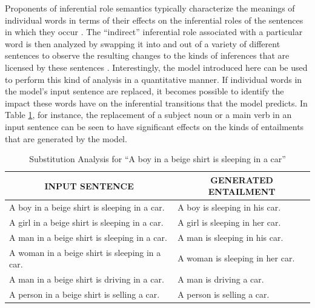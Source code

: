 Proponents of inferential role semantics typically characterize the meanings of individual words in terms of their effects on the inferential roles of the sentences in which they occur \citep{Brandom:1994,Brandom:2000,Block:1986}. The ``indirect'' inferential role associated with a particular word is then analyzed by swapping it into and out of a variety of different sentences to observe the resulting changes to the kinds of inferences that are licensed by these sentences \citep{Brandom:1994}. Interestingly, the model introduced here can be used to perform this kind of analysis in a quantitative manner. If individual words in the model's input sentence are replaced, it becomes possible to identify the impact these words have on the inferential transitions that the model predicts. In Table \ref{tab:sub}, for instance, the replacement of a subject noun or a main verb in an input sentence can be seen to have significant effects on the kinds of entailments that are generated by the model. 

\begin{table}[!t]
\begin{center} 

\caption{Substitution Analysis for ``A boy in a beige shirt is sleeping in a car''} 

\label{tab:sub}
\vskip 0.06in
\setlength{\tabcolsep}{12pt}
\begin{tabular}{ll} 
\hline

\multicolumn{1}{c}{\rule{0pt}{3ex} INPUT SENTENCE} & 
\multicolumn{1}{c}{GENERATED ENTAILMENT} \\

\hline
\rule{0pt}{3ex}A boy in a beige shirt is sleeping in a car. & A boy is sleeping in his car. \\
A girl in a beige shirt is sleeping in a car. & A girl is sleeping in her car. \\
A man in a beige shirt is sleeping in a car. & A man is sleeping in his car. \\
A woman in a beige shirt is sleeping in a car. & A woman is sleeping in her car. \\
A man in a beige shirt is driving in a car. & A man is driving a car. \\
A person in a beige shirt is selling a car. & A person is selling a car. \\
\hline
\end{tabular}
\end{center} 
\end{table}

